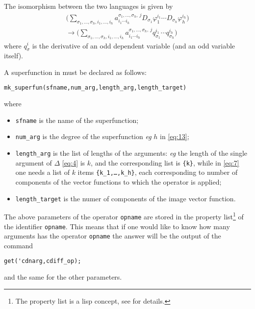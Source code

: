 The isomorphism between the two languages is given by
\begin{equation}
  \label{eq:13}
  \begin{split}
  \Big(\sum_{\sigma_1,\ldots,\sigma_h, i_1,\ldots,
    i_h}a^{\sigma_1,\ldots,\sigma_h,\ j}_{i_1\cdots i_h} D_{\sigma_1}
  \varphi_1^{i_1}\cdots D_{\sigma_h}\varphi_h^{i_h}\Big) \\
  \longrightarrow
    \Big(\sum_{\sigma_1,\ldots,\sigma_h, i_1,\ldots,
      i_h}a^{\sigma_1,\ldots,\sigma_h,\ j}_{i_1\cdots i_h}
        q^{i_1}_{\sigma_1} \cdots q^{i_h}_{\sigma_h}\Big)
      \end{split}
    \end{equation}
where $q^i_\sigma$ is the derivative of an odd dependent variable (and an odd
variable itself).

A superfunction in \cde must be declared as follows:
\begin{verbatim}
mk_superfun(sfname,num_arg,length_arg,length_target)
\end{verbatim}
where
\begin{itemize}
\item \texttt{sfname} is the name of the superfunction;
\item \texttt{num\_arg} is the degree of the superfunction \emph{eg} $h$ in
  \eqref{eq:13};
\item \texttt{length\_arg} is the list of lengths of the arguments: \emph{eg}
  the length of the single argument of $\Delta$ \eqref{eq:4} is $k$, and the
  corresponding list is \texttt{\{k\}}, while in \eqref{eq:7} one needs a list
  of $k$ items \texttt{\{k\_1,\dots,k\_h\}}, each corresponding to number of
  components of the vector functions to which the operator is applied;
\item \texttt{length\_target} is the numer of components of the image vector
  function.
\end{itemize}
The above parameters of the operator \texttt{opname} are stored in the property
list\footnote{The property list is a lisp concept, see \cite{NormanVitolo:InsideReduce} for
  details.} of the identifier \texttt{opname}. This means that if one would
like to know how many arguments has the operator \texttt{opname} the answer
will be the output of the command
\begin{verbatim}
get('cdnarg,cdiff_op);
\end{verbatim}
and the same for the other parameters.


